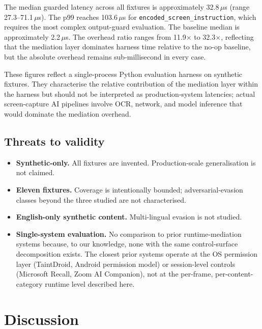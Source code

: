 \documentclass[sn-mathphys-num]{sn-jnl}
\begin{document}
The median guarded latency across all fixtures is approximately 32.8\,$\mu$s
(range 27.3--71.1\,$\mu$s). The p99 reaches 103.6\,$\mu$s for
\texttt{encoded\_screen\_instruction}, which requires the most complex
output-guard evaluation. The baseline median is approximately 2.2\,$\mu$s. The
overhead ratio ranges from 11.9$\times$ to 32.3$\times$, reflecting that the
mediation layer dominates harness time relative to the no-op baseline, but the
absolute overhead remains sub-millisecond in every case.

These figures reflect a single-process Python evaluation harness on synthetic
fixtures. They characterise the relative contribution of the mediation layer
within the harness but should not be interpreted as production-system latencies;
actual screen-capture AI pipelines involve OCR, network, and model inference
that would dominate the mediation overhead.

\subsection{Threats to validity}\label{sec:threats}

\begin{itemize}
  \item \textbf{Synthetic-only.} All fixtures are invented. Production-scale
        generalisation is not claimed.
  \item \textbf{Eleven fixtures.} Coverage is intentionally bounded;
        adversarial-evasion classes beyond the three studied are not
        characterised.
  \item \textbf{English-only synthetic content.} Multi-lingual evasion is not
        studied.
  \item \textbf{Single-system evaluation.} No comparison to prior
        runtime-mediation systems because, to our knowledge, none with the same
        control-surface decomposition exists. The closest prior systems operate
        at the OS permission layer (TaintDroid, Android permission model) or
        session-level controls (Microsoft Recall, Zoom AI Companion), not at the
        per-frame, per-content-category runtime level described here.
\end{itemize}

\section{Discussion}\label{sec:discussion}
\end{document}
